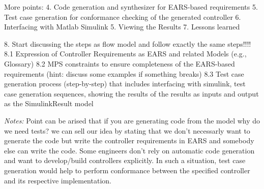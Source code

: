 More points:
4. Code generation and synthesizer for EARS-based requirements
5. Test case generation for conformance checking of the generated controller
6. Interfacing with Matlab Simulink
5. Viewing the Results
7. Lessons learned

8. Start discussing the steps as flow model and follow exactly the same
steps!!!! 
8.1 Expression of Controller Requirements as EARS and related Models (e.g.,
Glossary) 
8.2 MPS constraints to ensure completeness of the EARS-based requirements
(hint: discuss some examples if something breaks) 
8.3 Test case generation process (step-by-step) that includes interfacing with
simulink, test case generation sequences, showing the results of the results as
inputs and output as the SimulinkResult model

\emph{Notes:}
Point can be arised that if you are generating code from the model why do we need tests? we can sell our
idea by stating that we don't necessarly want to generate the code but write the
controller requirements in EARS and somebody else can write the code. Some
engineers don't rely on automatic code generation and want to develop/build
controllers explicitly. In such a situation, test case generation would help to
perform conformance between the specified controller and its respective
implementation. 